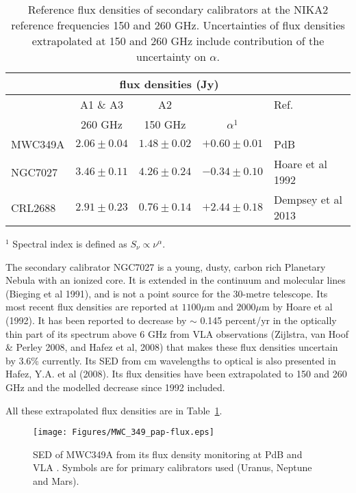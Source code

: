\begin{table}[t]
\begin{center}    
  \begin{threeparttable}

\begin{tabular}{|l|c|c|c|l|}
\hline
\multicolumn{1}{|c}{}  & \multicolumn{3}{|c}{flux  densities (Jy)} & \multicolumn{1}{|c|}{}  \\
\hline
         &    A1 \& A3       &  A2             &          &   Ref. \\
         &  260 GHz           &  150 GHz         & $\alpha^1$ &      \\
\hline
MWC349A   &   $2.06\pm0.04$  &  $1.48\pm0.02$ &  $+0.60\pm0.01$      &  PdB \cite{krips}    \\
NGC7027  &   $3.46\pm0.11$   &  $4.26\pm0.24$  &  $-0.34\pm0.10$     &  Hoare et al 1992 \cite{Hoare}      \\
CRL2688  &   $2.91\pm0.23$   &  $0.76\pm0.14$  &  $+2.44\pm0.18$     &  Dempsey et al 2013  \cite{Dempsey} \\
\hline
\end{tabular}
  \begin{tablenotes}
{\small     
  \item[$^1$]  Spectral index is defined as $S_{\nu} \propto \nu^{\alpha}$. 
}
  \end{tablenotes}
\end{threeparttable}
\caption[]{Reference flux densities of secondary calibrators at the NIKA2 reference frequencies 150 and 260 GHz. Uncertainties of flux densities extrapolated
at 150 and 260 GHz include contribution of the uncertainty on $\alpha$.}
\label{tab:flux_ref_sec}
\end{center}
\end{table}

The secondary calibrator NGC7027 is a young, dusty, carbon rich
Planetary Nebula with an ionized core.  It is extended in the
continuum and molecular lines (Bieging et al 1991), and is not a point
source for the 30-metre telescope.  Its most recent flux densities are
reported at $1100\mu$m and $2000\mu$m by Hoare et al (1992). It has
been reported to decrease by $\sim$ 0.145 percent/yr in the optically
thin part of its spectrum above $6$ GHz from VLA observations
(Zijlstra, van Hoof \& Perley 2008, and Hafez et al, 2008) that makes
these flux densities uncertain by 3.6\% currently. Its SED from cm
wavelengths to optical is also presented in Hafez, Y.A. et al (2008).
Its flux densities have been extrapolated to 150 and 260 GHz and the
modelled decrease since 1992 included.

All these extrapolated flux densities are in
Table~\ref{tab:flux_ref_sec}.

\begin{figure}[h]
\begin{center}
  \texttt{[image: Figures/MWC\_349\_pap-flux.eps]}
  \caption[MWC349 spectral energy density]{SED of MWC349A from its flux density monitoring at PdB and VLA \cite{krips}.
  Symbols are for primary calibrators used (Uranus, Neptune and Mars).}
\label{fig:Krips2017}
\end{center}
\end{figure}

